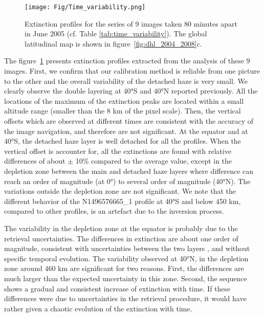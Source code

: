 \begin{figure}[!ht]
    \centering
    \texttt{[image: Fig/Time\_variability.png]}
    \caption{Extinction profiles for the series
    of 9 images taken 80 minutes apart in June 2005 (cf. Table \ref{tab:time_variability}).
    The global latitudinal map is shown in figure~\ref{fig:dhl_2004_2008}c.}
    \label{fig:time_variability}
\end{figure}

The figure~\ref{fig:time_variability} presents extinction profiles extracted from the analysis of these 9 images.
First, we confirm that our calibration method is reliable from one picture to the other and the overall
variability of the detached haze is very small. We clearly observe the double layering at \ang{40}S and \ang{40}N reported
previously. All the locations of the maximum of the extinction peaks are located within a small altitude range (smaller
than the 8 km of the pixel scale). Then, the vertical offsets which are observed at different times are consistent
with  the accuracy of the image navigation, and therefore are not significant. At the equator and at \ang{40}S, the detached
haze layer is well detached for all the profiles. When the vertical offset is accounter for, all the extinctions are found
with relative differences of about $\pm$ 10\% compared to the average value, except in the depletion zone between
the main and detached haze layers where difference can reach an order of magnitude (at \ang{0}) to several order of magnitude
(\ang{40}N). The variations outside the depletion zone are not significant. We note that the different behavior of the
N1496576665\_1 profile at \ang{40}S and below 450 km, compared to other profiles, is an artefact due to the inversion
process.

The variability in the depletion zone at the equator is probably due to the retrieval uncertainties. The differences in
extinction are about one order of magnitude, consistent with uncertainties between the two layers
\citep[\emph{e.g.}][]{West2018}, and without specific temporal evolution.
The variability observed at \ang{40}N, in the depletion zone around 460 km are significant for two reasons.
First, the differences are much larger than the expected uncertainty in this zone. Second, the sequence shows
a gradual and consistent increase of extinction with time. If these differences were due to uncertainties in
the retrieval procedure, it would have rather given a chaotic evolution of the extinction with time.

